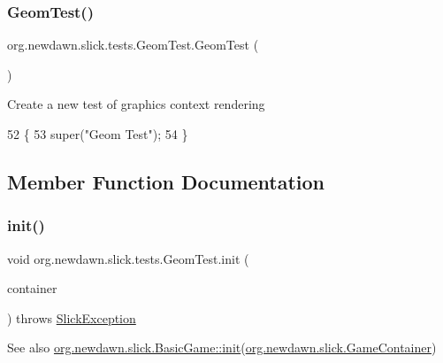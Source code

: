 \subsubsection{\texorpdfstring{Geom\+Test()}{GeomTest()}}
{\footnotesize\ttfamily org.\+newdawn.\+slick.\+tests.\+Geom\+Test.\+Geom\+Test (\begin{DoxyParamCaption}{ }\end{DoxyParamCaption})\hspace{0.3cm}{\ttfamily [inline]}}

Create a new test of graphics context rendering 
\begin{DoxyCode}
52                       \{
53         super(\textcolor{stringliteral}{"Geom Test"});
54     \}
\end{DoxyCode}


\subsection{Member Function Documentation}
\mbox{\label{classorg_1_1newdawn_1_1slick_1_1tests_1_1_geom_test_a5ef0548c063e670c9c731d9322d4c8df}} 
\subsubsection{\texorpdfstring{init()}{init()}}
{\footnotesize\ttfamily void org.\+newdawn.\+slick.\+tests.\+Geom\+Test.\+init (\begin{DoxyParamCaption}\item[{\mbox{\hyperlink{classorg_1_1newdawn_1_1slick_1_1_game_container}{Game\+Container}}}]{container }\end{DoxyParamCaption}) throws \mbox{\hyperlink{classorg_1_1newdawn_1_1slick_1_1_slick_exception}{Slick\+Exception}}\hspace{0.3cm}{\ttfamily [inline]}}

\begin{DoxySeeAlso}{See also}
\mbox{\hyperlink{classorg_1_1newdawn_1_1slick_1_1_basic_game_a8af0900217e4d389249f71367b22d114}{org.\+newdawn.\+slick.\+Basic\+Game\+::init}}(\mbox{\hyperlink{classorg_1_1newdawn_1_1slick_1_1_game_container}{org.\+newdawn.\+slick.\+Game\+Container}}) 
\end{DoxySeeAlso}


